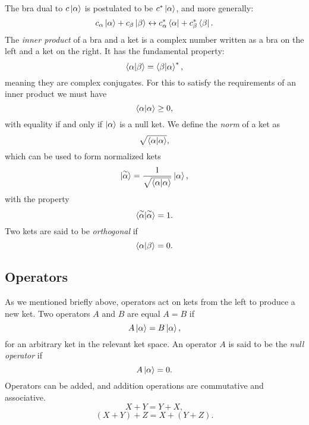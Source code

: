 The bra dual to $c \ket{\alpha}$ is postulated to be $c^* \ket{\alpha}$,
and more generally:
\begin{equation}
c_{\alpha} \ket{\alpha} + c_{\beta} \ket{\beta} \leftrightarrow
c_{\alpha}^* \bra{\alpha} + c_{\beta}^* \bra{\beta} .
\end{equation}
The \textit{inner product} of a bra and a ket is a complex number
written as a bra on the left and a ket on the right.
It has the fundamental property:
\begin{equation}
\braket{\alpha | \beta} = \braket{\beta | \alpha}^* ,
\end{equation}
meaning they are complex conjugates.
For this to satisfy the requirements of an inner product we must have
\begin{equation}
\braket{\alpha | \alpha} \geq 0 ,
\end{equation}
with equality if and only if $\ket{\alpha}$ is a null ket.
We define the \textit{norm} of a ket as
\begin{equation}
\sqrt{\braket{\alpha | \alpha}} ,
\end{equation}
which can be used to form normalized kets
\begin{equation}
\ket{\overset{\sim}{\alpha}} =
\frac{1}{\sqrt{\braket{\alpha | \alpha}}} \ket{\alpha} ,
\end{equation}
with the property
\begin{equation}
\braket{\overset{\sim}{\alpha} | \overset{\sim}{\alpha}} = 1 .
\end{equation}
Two kets are said to be \textit{orthogonal} if
\begin{equation}
 \braket{\alpha | \beta} = 0 .
\end{equation}

\subsection{Operators}
As we mentioned briefly above, operators act on kets from the left
to produce a new ket. Two operators $A$ and $B$ are equal $A=B$ if
\begin{equation}
 A \ket{\alpha} = B \ket{\alpha} ,
\end{equation}
for an arbitrary ket in the relevant ket space. An operator $A$
is said to be the \textit{null operator} if
\begin{equation}
 A \ket{\alpha} = 0 .
\end{equation}
Operators can be added, and addition operations are commutative and associative.
\begin{equation}
 X + Y = Y + X ,
\end{equation}
\begin{equation}
 (X + Y) + Z = X + (Y + Z) .
\end{equation}

